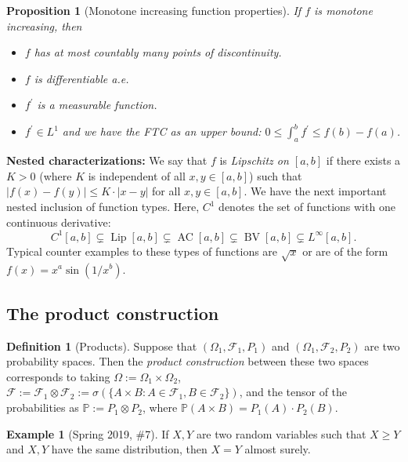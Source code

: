 \documentclass[12pt,reqno]{article}
\renewcommand{\emph}[1]{\textit{#1}}
\theoremstyle{plain}
\newtheorem{prop}[theorem]{Proposition}
\theoremstyle{definition}
\newtheorem{definition}[theorem]{Definition}
\newtheorem{example}[theorem]{Example}
\begin{document}
\begin{prop}[Monotone increasing function properties]
If $f$ is \emph{monotone increasing}, then 
\begin{itemize}
\item[(a)] $f$ has at most countably many points of discontinuity. 
\item[(b)] $f$ is differentiable a.e.
\item[(c)] $f^{\prime}$ is a measurable function.
\item[(d)] $f^{\prime} \in L^1$ and we have the FTC as an upper bound: 
     $0 \leq \int_a^b f^{\prime} \leq f(b) - f(a)$.
\end{itemize} 
\end{prop} 
\noindent 
\textbf{Nested characterizations:} 
We say that $f$ is \emph{Lipschitz on $[a,b]$} if there exists a $K > 0$ (where $K$ is 
independent of all $x,y \in [a,b]$) such that 
$|f(x)-f(y)| \leq K \cdot |x-y|$ for all $x,y \in [a,b]$. 
We have the next important nested inclusion of function types. Here, 
$C^1$ denotes the set of functions with one continuous derivative:
\[
C^1[a,b] \subsetneq \operatorname{Lip}[a,b] \subsetneq \operatorname{AC}[a,b] \subsetneq 
     \operatorname{BV}[a,b] \subsetneq L^{\infty}[a,b]. 
\] 
Typical counter examples to these types of functions are $\sqrt{x}$ or are of the form 
$f(x) = x^a \sin(1 / x^b)$. 

\subsection{The product construction} 

\begin{definition}[Products]
Suppose that $(\Omega_1, \mathcal{F}_1, P_1)$ and 
$(\Omega_1, \mathcal{F}_2, P_2)$ are two probability spaces. 
Then the \emph{product construction} between these two spaces 
corresponds to taking $\Omega := \Omega_1 \times \Omega_2$, 
$\mathcal{F} := \mathcal{F}_1 \otimes \mathcal{F}_2 := \sigma( 
 \{A \times B: A \in \mathcal{F}_1, B \in \mathcal{F}_2\})$, and the 
tensor of the probabilities as $\mathbb{P} := P_1 \otimes P_2$, where 
$\mathbb{P}(A \times B) = P_1(A) \cdot P_2(B)$. 
\end{definition} 

\begin{example}[Spring 2019, \#7]
If $X,Y$ are two random variables such that $X \geq Y$ and $X,Y$ have the 
same distribution, then $X = Y$ almost surely. 
\end{example} 
\end{document}
